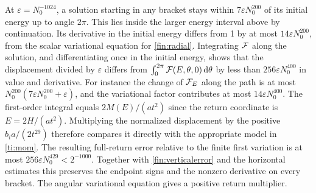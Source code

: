 At \(\varepsilon=N_0^{-1024}\), a solution starting in any bracket stays
within \(7\varepsilon N_0^{200}\) of its initial energy up to angle \(2\pi\).
This lies inside the larger energy interval above by continuation.
Its derivative in the initial energy differs from 1 by at most
\(14\varepsilon N_0^{200}\), from the scalar variational equation for
\eqref{fin:radial}. Integrating \(\mathcal F\) along the solution, and differentiating
once in the initial energy, shows that the displacement divided by
\(\varepsilon\) differs from \(\int_0^{2\pi}\mathcal F(E,\theta,0)\,\mathrm{d}\theta\) by
less than \(256\varepsilon N_0^{400}\) in value and derivative. For instance
the change of \(\mathcal F_E\) along the path is at most
\(N_0^{200}(7\varepsilon N_0^{200}+\varepsilon)\), and the variational factor
contributes at most \(14\varepsilon N_0^{400}\).
The first-order integral equals \(2M(E)/(at^2)\) since the return coordinate
is \(E=2H/(at^2)\). Multiplying the normalized displacement by the positive
\(b_i a/(2t^{29})\) therefore compares it directly with the appropriate
model in \eqref{ti:mom}. The resulting full-return error relative to the
finite first variation is at most \(256\varepsilon N_0^{429}<2^{-1000}\).
Together with \eqref{fin:verticalerror} and the horizontal estimates this
preserves the endpoint signs and the nonzero derivative on every bracket.
The angular variational equation gives a positive return multiplier.
